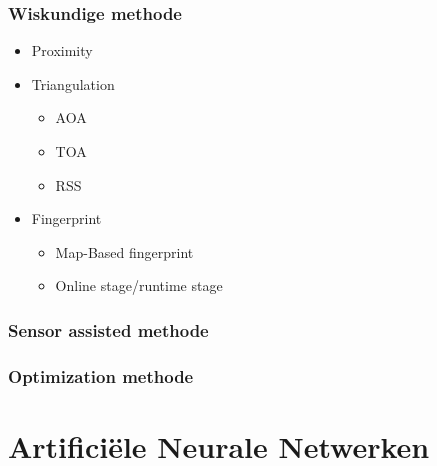 		\subsubsection{Wiskundige methode}
			\begin{itemize}
				\item Proximity
				\item Triangulation
					\begin{itemize}
						\item AOA
						\item TOA
						\item RSS
					\end{itemize}
				\item Fingerprint
					\begin{itemize}
						\item Map-Based fingerprint
						\item Online stage/runtime stage
					\end{itemize}
			\end{itemize}
		\subsubsection{Sensor assisted methode}
		\subsubsection{Optimization methode}
\section{Artificiële Neurale Netwerken}

